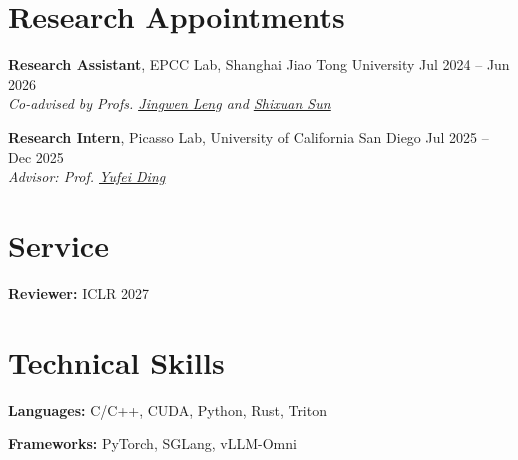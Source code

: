 \documentclass[10pt, letterpaper]{article}
\newcommand{\cvulink}[2]{\underline{\href{#1}{#2}}}
\newcommand{\entrysep}{\vspace{4pt}}
\begin{document}
\section{Research Appointments}

\textbf{Research Assistant}, EPCC Lab,
Shanghai Jiao Tong University
\hfill Jul 2024 -- Jun 2026\\
\textit{
Co-advised by Profs.
\cvulink{https://www.cs.sjtu.edu.cn/~leng-jw/}{Jingwen Leng}
and
\cvulink{https://shixuansun.github.io/}{Shixuan Sun}
}

\entrysep

\textbf{Research Intern}, Picasso Lab,
University of California San Diego
\hfill Jul 2025 -- Dec 2025\\
\textit{
Advisor:
Prof. \cvulink{https://sites.google.com/ucsd.edu/yufeiding}{Yufei Ding}
}

\section{Service}

\textbf{Reviewer:}
ICLR 2027

\section{Technical Skills}

\textbf{Languages:}
C/C++, CUDA, Python, Rust, Triton

\textbf{Frameworks:}
PyTorch, SGLang, vLLM-Omni
\end{document}
